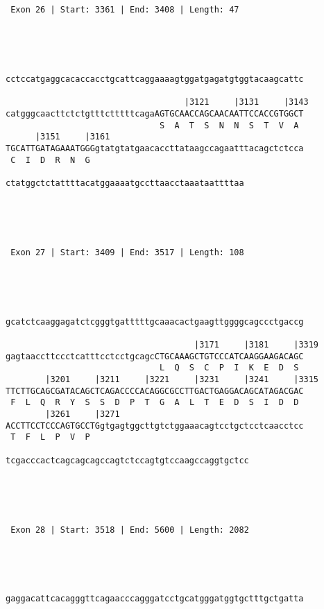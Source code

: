 \documentclass{article}
\begin{document}
\begin{Verbatim}
 Exon 26 | Start: 3361 | End: 3408 | Length: 47 




                                                            
cctccatgaggcacaccacctgcattcaggaaaagtggatgagatgtggtacaagcattc
                                                            
                                    |3121     |3131     |3143
catgggcaacttctctgtttctttttcagaAGTGCAACCAGCAACAATTCCACCGTGGCT
                               S  A  T  S  N  N  S  T  V  A 
      |3151     |3161                                       
TGCATTGATAGAAATGGGgtatgtatgaacaccttataagccagaatttacagctctcca
 C  I  D  R  N  G                                           
                                                
ctatggctctattttacatggaaaatgccttaacctaaataattttaa
                                                




 Exon 27 | Start: 3409 | End: 3517 | Length: 108 




                                                            
gcatctcaaggagatctcgggtgatttttgcaaacactgaagttggggcagccctgaccg
                                                            
                                      |3171     |3181     |3319
gagtaaccttccctcatttcctcctgcagcCTGCAAAGCTGTCCCATCAAGGAAGACAGC
                               L  Q  S  C  P  I  K  E  D  S 
        |3201     |3211     |3221     |3231     |3241     |3315
TTCTTGCAGCGATACAGCTCAGACCCCACAGGCGCCTTGACTGAGGACAGCATAGACGAC
 F  L  Q  R  Y  S  S  D  P  T  G  A  L  T  E  D  S  I  D  D 
        |3261     |3271                                     
ACCTTCCTCCCAGTGCCTGgtgagtggcttgtctggaaacagtcctgctcctcaacctcc
 T  F  L  P  V  P                                           
                                                 
tcgacccactcagcagcagccagtctccagtgtccaagccaggtgctcc
                                                 




 Exon 28 | Start: 3518 | End: 5600 | Length: 2082 




                                                            
gaggacattcacagggttcagaacccagggatcctgcatgggatggtgctttgctgatta
                                                            

\end{Verbatim}
\end{document}
